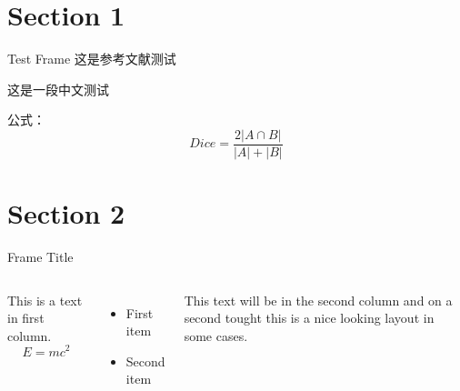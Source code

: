 \section{Section 1}
\begin{frame}[c]{Test Frame} %
    这是参考文献测试\cite{Cheplygina2018NotsosupervisedAS}
    
    这是一段中文测试
    
    公式：
    \[Dice = \frac{2 |A \cap B|}{|A| + |B|}\]
\end{frame}
 
\section{Section 2}
\begin{frame}[c]{Frame Title}
    \begin{columns}
    This is a text in first column.
    $$E=mc^2$$
    \begin{itemize}
    \item First item
    \item Second item
    \end{itemize}
     
    This text will be in the second column
    and on a second tought this is a nice looking
    layout in some cases.
    \end{columns}
\end{frame}


